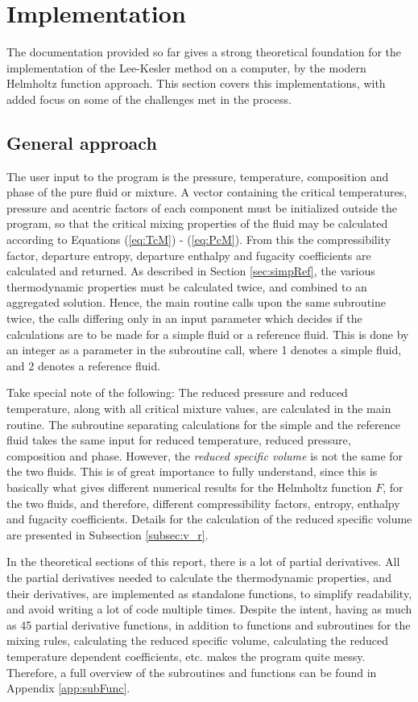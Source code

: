 \documentclass[english]{../thermomemo/thermomemo}
\numberwithin{equation}{section}
\newcommand*{\reff}[1]{(\ref{#1})}
\begin{document}
\section{Implementation}
The documentation provided so far gives a strong theoretical foundation for the implementation of the Lee-Kesler method on a computer, by the modern Helmholtz function approach. This section covers this implementations, with added focus on some of the challenges met in the process. 

\subsection{General approach}
The user input to the program is the pressure, temperature, composition and phase of the pure fluid or mixture. A vector containing the critical temperatures, pressure and acentric factors of each component must be initialized outside the program, so that the critical mixing properties of the fluid may be calculated according to Equations \reff{eq:TcM} - \reff{eq:PcM}. From this the compressibility factor, departure entropy, departure enthalpy and fugacity coefficients are calculated and returned. As described in Section \ref{sec:simpRef}, the various thermodynamic properties must be calculated twice, and combined to an aggregated solution. Hence, the main routine calls upon the same subroutine twice, the calls differing only in an input parameter which decides if the calculations are to be made for a simple fluid or a reference fluid. This is done by an integer as a parameter in the subroutine call, where 1 denotes a simple fluid, and 2 denotes a reference fluid.

Take special note of the following: The reduced pressure and reduced temperature, along with all critical mixture values, are calculated in the main routine. The subroutine separating calculations for the simple and the reference fluid takes the same input for reduced temperature, reduced pressure, composition and phase. However, the \textit{reduced specific volume} is not the same for the two fluids. This is of great importance to fully understand, since this is basically what gives different numerical results for the Helmholtz function $F$, for the two fluids, and therefore, different compressibility factors, entropy, enthalpy and fugacity coefficients. Details for the calculation of the reduced specific volume are presented in Subsection \ref{subsec:v_r}.

In the theoretical sections of this report, there is a lot of partial derivatives. All the partial derivatives needed to calculate the thermodynamic properties, and their derivatives, are implemented as standalone functions, to simplify readability, and avoid writing a lot of code multiple times. Despite the intent, having as much as 45 partial derivative functions, in addition to functions and subroutines for the mixing rules, calculating the reduced specific volume, calculating the reduced temperature dependent coefficients, etc. makes the program quite messy. Therefore, a full overview of the subroutines and functions can be found in Appendix \ref{app:subFunc}.
\end{document}
